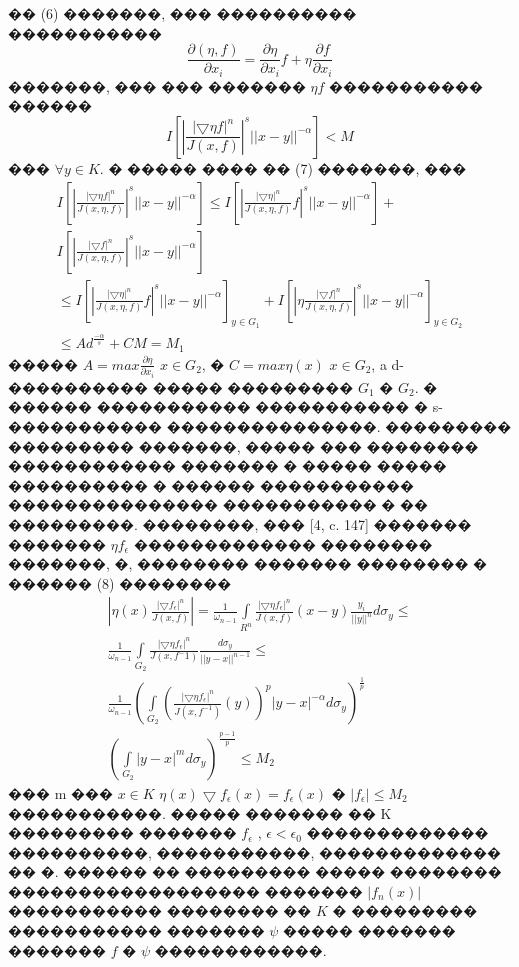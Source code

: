 \documentclass[a5paper, 12pt, openbib]{report}
\begin{document}
�� (6) �������, ��� ���������� �����������
\begin{equation}
\frac{\partial(\eta,f)}{\partial x_i}=\frac{\partial\eta}{\partial x_i}f+\eta\frac{\partial f}{\partial x_i}
\end{equation}
�������, ��� ��� ������� $\eta f$ ����������� ������
$$
I\left[\left|\frac{|\bigtriangledown\eta f|^{n}}{J(x,f)}
\right|^{s}||x-y||^{-\alpha}\right]<M
$$
��� $\forall y\in K$. � ����� ���� �� (7) �������, ��� 
\begin{multline}
I\left[\left|\frac{|\bigtriangledown\eta f|^{n}}{J(x,\eta,f)}
\right|^{s}||x-y||^{-\alpha}\right]\leq I\left[\left|\frac{|\bigtriangledown\eta|^{n}}{J(x,\eta,f)}f
\right|^{s}||x-y||^{-\alpha}\right]+\\I\left[\left|\frac{|\bigtriangledown f|^{n}}{J(x,\eta,f)}
\right|^{s}||x-y||^{-\alpha}\right]
\\
\leq I\left[\left|\frac{|\bigtriangledown\eta|^{n}}{J(x,\eta,f)}f
\right|^{s}||x-y||^{-\alpha}\right]_{y\in G_1}+I\left[\left|\eta\frac{|\bigtriangledown f|^{n}}{J(x,\eta,f)}
\right|^{s}||x-y||^{-\alpha}\right]_{y\in G_2}\\\leq Ad^{\frac{-\alpha}{s}}+CM=M_1
\end{multline}
����� $A=max\frac{\partial\eta}{\partial x_i}$ $x\in G_2$, � $C=max\eta(x)$ $x\in G_2$, a d-���������� ����� ��������� $G_1$  � $G_2$. � ������ ����������� ����������� � s-����������� ���������������. ��������� ��������� �������, �����   ��� �������� ������������ ������� � ����� ����� ���������� � ������ ����������� ��������������� ����������� � �� ���������.
 ��������, ��� [4, c. 147] ������� ������� $\eta f_\epsilon$ ������������� �������� �������, �, �������� ������� �������� � ������ (8)  ��������
 \begin{multline}
 \left|\eta(x)\frac{|\bigtriangledown f_\epsilon|^n}{J(x,f)}\right|=\frac{1}{\omega_{n-1}}\int\limits_{R^n}\frac{|\bigtriangledown\eta f_\epsilon|^n}{J(x,f)}(x-y)\frac{y_i}{||y||^n}d\sigma_{y}\leq
 \\
 \frac{1}{\omega_{n-1}}\int\limits_{G_2}\frac{|\bigtriangledown\eta f_\epsilon|^n}{J(x,f^-1)}\frac{d\sigma_{y}}{||y-x||^{n-1}}\leq
 \\
 \frac{1}{\omega_{n-1}}\left(\int\limits_{G_2}\left(\frac{|\bigtriangledown\eta f_\epsilon|^n}{J(x,f^{-1})}(y)\right)^p |y-x|^{-\alpha}d\sigma_y\right)^{\frac{1}{p}}\\\left(\int\limits_{G_2}|y-x|^{m}d\sigma_y\right)^{\frac{p-1}{p}}\leq M_2
\end{multline}
 ��� m 
���  $x\in K$ $\eta(x)\bigtriangledown f_{\epsilon}(x)=f_{\epsilon}(x)$   � $|f_\epsilon|\leq M_2$  �����������.
����� ������� �� K ��������� ������� $f_\epsilon$ , $\epsilon<\epsilon_0$   ������������� ����������, �����������, ������������� �� �. ������ �� ��������� ����� �������� ������������������ ������� $|f_{n}(x)|$  ����������� �������� �� $K$ � ��������� ����������� ������� $\psi$ ����� ������� ������� $f$ � $\psi$ ������������.
\end{document}
